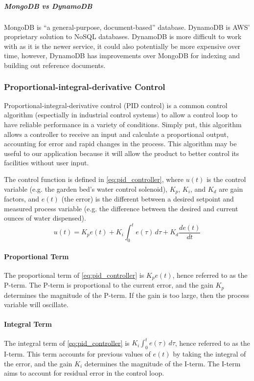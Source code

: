 \subparagraph{MongoDB vs DynamoDB}
MongoDB is ``a general-purpose, document-based'' database. DynamoDB is AWS' proprietary solution to NoSQL databases. DynamoDB is more difficult to work with as it is the newer service, it could also potentially be more expensive over time, however, DynamoDB has improvements over MongoDB for indexing and building out reference documents. 

\subsubsection{Proportional-integral-derivative Control}
Proportional-integral-derivative control (PID control) is a common control algorithm (espectially in industrial control systems) to allow a control loop to have reliable performance in a variety of conditions. Simply put, this algorithm allows a controller to receive an input and calculate a proportional output, accounting for error and rapid changes in the process. This algorithm may be useful to our application because it will allow the product to better control its facilities without user input.

The control function is defined in \autoref{eq:pid_controller}, where $u(t)$ is the control variable (e.g. the garden bed's water control solenoid), $K_p$, $K_i$, and $K_d$ are gain factors, and $e(t)$ (the error) is the different between a desired setpoint and measured process variable (e.g. the difference between the desired and current ounces of water dispensed).
\begin{equation}
    \label{eq:pid_controller}
    u(t) = K_pe(t) + K_i\int_{0}^{t}e(\tau) \, d\tau + K_d\frac{de(t)}{dt}
\end{equation}

\paragraph{Proportional Term} The proportional term of \autoref{eq:pid_controller} is $K_pe(t)$, hence referred to as the P-term. The P-term is proportional to the current error, and the gain $K_p$ determines the magnitude of the P-term. If the gain is too large, then the process variable will oscillate.

\paragraph{Integral Term} The integral term of \autoref{eq:pid_controller} is $K_i\int_{0}^{t}e(\tau) \, d\tau$, hence referred to as the I-term. This term accounts for previous values of $e(t)$ by taking the integral of the error, and the gain $K_i$ determines the magnitude of the I-term. The I-term aims to account for residual error in the control loop.

